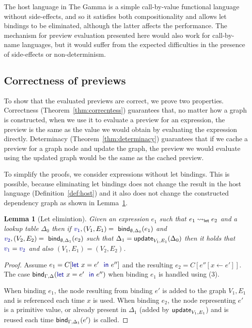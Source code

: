 \documentclass[sigplan,10pt]{acmart}\settopmatter{printfolios=true,printccs=false,printacmref=false}
\newcounter{thc}
\theoremstyle{plain}
\newtheorem{lem}[thc]{Lemma}
\theoremstyle{definition}
\newcommand{\ident}[1]{\textnormal{\sffamily #1}}
\newcommand{\kvd}[1]{\textnormal{\textcolor{kvdclr}{\sffamily #1}}}
\newcommand{\bndclr}[1]{\textcolor{kvdclr}{#1}}
\begin{document}
\noindent
The host language in The Gamma is a simple call-by-value functional language without side-effects,
and so it satisfies both compositionality and allows let bindings to be eliminated, although the
latter affects the performance. The mechanism for preview evaluation presented here would also 
work for call-by-name languages, but it would suffer from the expected difficulties in the 
presence of side-effects or non-determinism.


\subsection{Correctness of previews}
\label{sec:properties-correct}

To show that the evaluated previews are correct, we prove two properties. Correctness 
(Theorem~\ref{thm:correcntess}) guarantees that, no matter how a graph is constructed, when we use
it to evaluate a preview for an expression, the preview is the same as the value we would obtain
by evaluating the expression directly. Determinacy (Theorem~\ref{thm:determinacy}) guarantees that if
we cache a preview for a graph node and update the graph, the preview we would evaluate using the
updated graph would be the same as the cached preview. 

To simplify the proofs, we consider expressions without let bindings. This is possible, because
eliminating let bindings does not change the result in the host language (Definition~\ref{def:host})
and it also does not change the constructed dependency graph as shown in Lemma~\ref{thm:let-elimination}.

\begin{lem}[Let elimintion]
\label{thm:let-elimination}  
Given an expression $e_1$ such that $e_1 \rightsquigarrow_\ident{let} e_2$ and a lookup table $\Delta_0$
then if $\bndclr{v_1}, (V_1, E_1) = \ident{bind}_{\emptyset, \Delta_0}(e_1)$ and  
$\bndclr{v_2}, (V_2, E_2) = \ident{bind}_{\emptyset, \Delta_1}(e_2)$ such that $\Delta_1 = \ident{update}_{V_1, E_1}(\Delta_0)$
then it holds that $\bndclr{v_1} = \bndclr{v_2}$ and also $(V_1, E_1) = (V_2, E_2)$.
\end{lem}
\begin{proof}
Assume $e_1 = C[\kvd{let}~x=e'~\kvd{in}~e'']$ and the resulting $e_2 = C[e''[x\leftarrow e']]$. The case 
$\ident{bind}_{\Gamma,\Delta}(\kvd{let}~x=e'~\kvd{in}~e'')$ when binding $e_1$ is handled using
(3).

When binding $e_1$, the node resulting from binding $e'$ is added to the graph $V_1, E_1$ and is 
referenced each time $x$ is used. When binding $e_2$, the node representing $e'$ is a primitive value,
or already present in $\Delta_1$ (added by $\ident{update}_{V_1, E_1}$) and is reused each time 
$\ident{bind}_{\Gamma,\Delta_1}(e')$ is called.
\end{proof}
\end{document}

